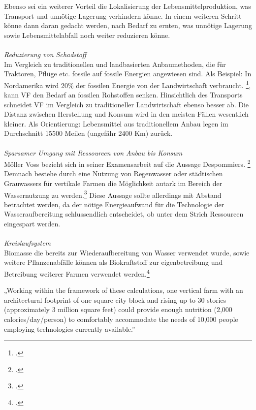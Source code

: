 \documentclass{scrartcl}
\begin{document}
Ebenso sei ein weiterer Vorteil die Lokalisierung der Lebensmittelproduktion, was Transport und unnötige Lagerung verhindern könne. In einem weiteren Schritt könne dann daran gedacht werden, nach Bedarf zu ernten, was unnötige Lagerung sowie Lebensmittelabfall noch weiter reduzieren könne.\\
\\
\textit{Reduzierung von Schadstoff}\\
Im Vergleich zu traditionellen und landbasierten Anbaumethoden, die für Traktoren, Pflüge etc. fossile auf fossile Energien angewiesen sind. Als Beispiel: In Nordamerika wird 20\% der fossilen Energie von der Landwirtschaft verbraucht. \footcite[Vgl.][S.27]{Al-Kodmany2018TheCity[82,83}, kann VF den Bedarf an fossilen Rohstoffen senken. Hinsichtlich des Transports schneidet VF im Vergleich zu traditioneller Landwirtschaft ebenso besser ab. Die Distanz zwischen Herstellung und Konsum wird in den meisten Fällen wesentlich kleiner. Als Orientierung: Lebensmittel aus traditionellem Anbau legen im Durchschnitt 15500 Meilen (ungefähr 2400 Km) zurück.\\
\\
\textit{Sparsamer Umgang mit Ressourcen von Anbau bis Konsum}\\
Möller Voss bezieht sich in seiner Examensarbeit auf die Aussage Despommiers. \footcite[S.9]{PeterMollerVoss2013VerticalRise} Demnach bestehe durch eine Nutzung von Regenwasser oder städtischen Grauwassers für vertikale Farmen die Möglichkeit autark im Bereich der Wassernutzung zu werden.\footcite[Vgl.]{Despommier2010TheCentury.} Diese Aussage sollte allerdings mit Abstand betrachtet werden, da der nötige Energieaufwand für die Technologie der Wasseraufbereitung schlussendlich entscheidet, ob unter dem Strich Ressourcen eingespart werden.\\
\\
\textit{Kreislaufsystem}\\
Biomasse die bereits zur Wiederaufbereitung von Wasser verwendet wurde, sowie weitere Pflanzenabfälle können als Biokraftstoff zur eigenbetreibung und Betreibung weiterer Farmen verwendet werden.\footcite[Vgl.][S.80ff]{Despommier2009TheFarms}\\

\begin{displayquote}
„Working within the framework of these calculations, one vertical farm with an architectural footprint of one square city block and rising up to 30 stories (approximately 3 million square feet) could provide enough nutrition (2,000 calories/day/person) to comfortably accommodate the needs of 10,000 people employing technologies currently available.” 
\end{displayquote}
\end{document}
